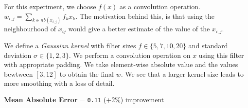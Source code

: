 \documentclass[11pt]{article}
\begin{document}
For this experiment, we choose $f(x)$ as a convolution operation. $w_{i,j} = \sum_{k \in nb(x_{i,j})} f_k x_k$. The motivation behind this, is that using the neighbourhood of $x_{ij}$ would give a better estimate of the value of the $x_{i,j}$.

We define a \textit{Gaussian kernel} with filter sizes $f \in \{ 5, 7, 10, 20 \}$ and standard deviation $\sigma \in \{ 1, 2, 3 \}$. We perform a convolution operation on $x$ using this filter with appropriate padding. We take element-wise absolute value and the values bewtween $[3, 12]$ to obtain the final $w$. We see that a larger kernel size leads to more smoothing with a loss of detail.

\medskip \noindent \textbf{Mean Absolute Error} = \texttt{0.11} (+2\%) improvement

\begin{figure}[H]%
    \centering
\end{figure}
\end{document}
